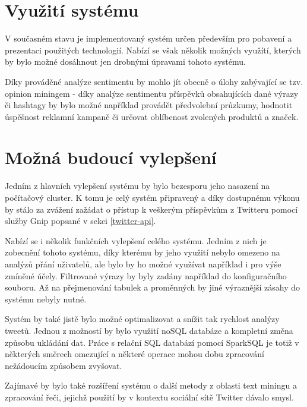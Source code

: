 \documentclass[thesis=B,czech]{FITthesis}[2012/06/26]
\begin{document}
\section{Využití systému}
V současném stavu je implementovaný systém určen především pro pobavení a prezentaci použitých technologií. Nabízí se však několik možných využítí, kterých by bylo možné dosáhnout jen drobnými úpravami tohoto systému. 

Díky prováděné analýze sentimentu by mohlo jít obecně o úlohy zabývající se tzv. opinion miningem - díky analýze sentimentu příspěvků obsahujících dané výrazy či hashtagy by bylo možné například provádět předvolební průzkumy, hodnotit úspěšnost reklamní kampaně či určovat oblíbenost zvolených produktů a značek. 


\section{Možná budoucí vylepšení}
Jedním z hlavních vylepšení systému by bylo bezesporu jeho nasazení na počítačový cluster. K tomu je celý systém připravený a díky dostupnému výkonu by stálo za zvážení zažádat o přístup k veškerým příspěvkům z Twitteru pomocí služby Gnip popsané v sekci \ref{twitter-api}. 

Nabízí se i několik funkčních vylepšení celého systému. Jedním z nich je zobecnění tohoto systému, díky kterému by jeho využití nebylo omezeno na analýzů přání uživatelů, ale bylo by ho možné využívat například i pro výše zmíněné účely. Filtrované výrazy by byly zadány například do konfiguračního souboru. Až na přejmenování tabulek a proměnných by jiné výraznější zásahy do systému nebyly nutné. 

Systém by také jistě bylo možné optimalizovat a snížit tak rychlost analýzy tweetů. Jednou z možností by bylo využití noSQL databáze a kompletní změna způsobu ukládání dat. Práce s relační SQL databází pomocí SparkSQL je totiž v některých směrech omezující a některé operace mohou dobu zpracování nežádoucím způsobem zvyšovat. 

Zajímavé by bylo také rozšíření systému o další metody z oblasti text miningu a zpracování řeči, jejichž použití by v kontextu sociální sítě Twitter dávalo smysl. 
\end{document}
